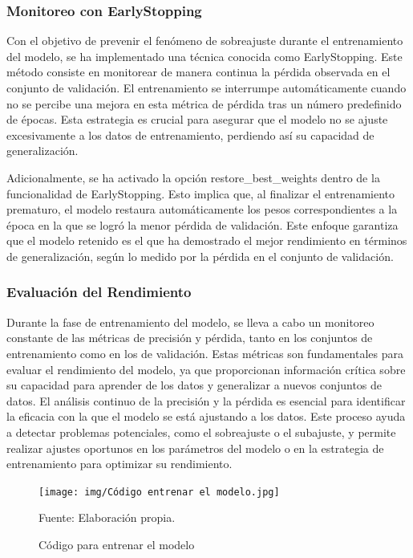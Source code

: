 \subsubsection{Monitoreo con EarlyStopping} 
Con el objetivo de prevenir el fenómeno de sobreajuste durante el entrenamiento del modelo, se ha implementado una técnica conocida como EarlyStopping. Este método consiste en monitorear de manera continua la pérdida observada en el conjunto de validación. El entrenamiento se interrumpe automáticamente cuando no se percibe una mejora en esta métrica de pérdida tras un número predefinido de épocas. Esta estrategia es crucial para asegurar que el modelo no se ajuste excesivamente a los datos de entrenamiento, perdiendo así su capacidad de generalización.

Adicionalmente, se ha activado la opción restore\_best\_weights dentro de la funcionalidad de EarlyStopping. Esto implica que, al finalizar el entrenamiento prematuro, el modelo restaura automáticamente los pesos correspondientes a la época en la que se logró la menor pérdida de validación. Este enfoque garantiza que el modelo retenido es el que ha demostrado el mejor rendimiento en términos de generalización, según lo medido por la pérdida en el conjunto de validación.


\subsubsection{Evaluación del Rendimiento} 
Durante la fase de entrenamiento del modelo, se lleva a cabo un monitoreo constante de las métricas de precisión y pérdida, tanto en los conjuntos de entrenamiento como en los de validación. Estas métricas son fundamentales para evaluar el rendimiento del modelo, ya que proporcionan información crítica sobre su capacidad para aprender de los datos y generalizar a nuevos conjuntos de datos. El análisis continuo de la precisión y la pérdida es esencial para identificar la eficacia con la que el modelo se está ajustando a los datos. Este proceso ayuda a detectar problemas potenciales, como el sobreajuste o el subajuste, y permite realizar ajustes oportunos en los parámetros del modelo o en la estrategia de entrenamiento para optimizar su rendimiento.

\begin{figure}[H]
    \begin{minipage}[t]{0.9\textwidth}
        \caption{Código para entrenar el modelo}
        \label{entrenar_modelo}        
    \end{minipage}

    \vspace{10pt}

    \begin{minipage}[b]{1\textwidth}
        \centering
        \texttt{[image: img/Código entrenar el modelo.jpg]}        
    \end{minipage}

    \begin{minipage}[t]{0.9\textwidth}
        Fuente: Elaboración propia.
    \end{minipage}
\end{figure}


